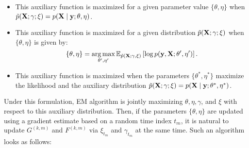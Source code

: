 \begin{itemize}
    \item This auxiliary function is maximized for a given parameter value $\{\theta,\eta\}$ when $\tilde p(\mathbf{X}; \gamma ; \xi) = p(\mathbf{X} \mid \mathbf{y}; \theta,\eta)$.
    \item This auxiliary function is maximized for a given distribution $\tilde p(\mathbf{X}; \gamma ; \xi)$ when $\{\theta,\eta\}$ is given by:
    \begin{equation}
        \left\{\theta,\eta\right\} = \operatorname*{arg\,max}_{\theta',\eta'} \mathbb{E}_{\tilde p(\mathbf{X} ; \gamma, \xi)} \left[\log p(\mathbf{y},\mathbf{X};\theta',\eta')\right].
    \end{equation}
    \item This auxiliary function is maximized when the parameters $\{\theta^*,\eta^*\}$ maximize the likelihood and the auxiliary distribution $\tilde p(\mathbf{X}; \gamma;\xi) = p(\mathbf{X} \mid \mathbf{y}; \theta^*,\eta^*)$.
\end{itemize}

Under this formulation, EM algorithm is jointly maximizing $\theta, \eta, \gamma$, and $\xi$ with respect to this auxiliary distribution. Then, if the parameters $\{\theta, \eta\}$ are updated using a gradient estimate based on a random time index $t_m$, it is natural to update $G^{(k,m)}$ and $F^{(k,m)}$ via $\xi_{t_m}$ and $\gamma_{t_m}$ at the same time. Such an algorithm looks as follows:


